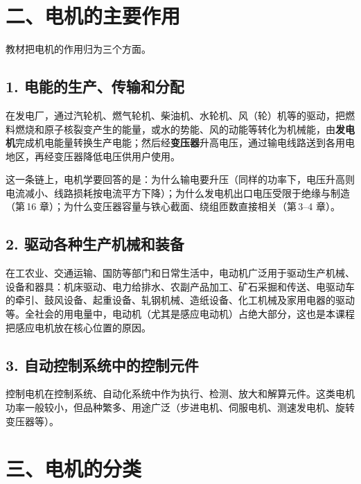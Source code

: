 
\section*{二、电机的主要作用}

教材把电机的作用归为三个方面。

\subsection*{1. 电能的生产、传输和分配}
在发电厂，通过汽轮机、燃气轮机、柴油机、水轮机、风（轮）机等的驱动，把燃料燃烧和原子核裂变产生的能量，或水的势能、风的动能等转化为机械能，由\textbf{发电机}完成机电能量转换生产电能；然后经\textbf{变压器}升高电压，通过输电线路送到各用电地区，再经变压器降低电压供用户使用。

这一条链上，电机学要回答的是：为什么输电要升压（同样的功率下，电压升高则电流减小、线路损耗按电流平方下降）；为什么发电机出口电压受限于绝缘与制造（第\,16 章）；为什么变压器容量与铁心截面、绕组匝数直接相关（第\,3--4 章）。

\subsection*{2. 驱动各种生产机械和装备}
在工农业、交通运输、国防等部门和日常生活中，电动机广泛用于驱动生产机械、设备和器具：机床驱动、电力给排水、农副产品加工、矿石采掘和传送、电驱动车的牵引、鼓风设备、起重设备、轧钢机械、造纸设备、化工机械及家用电器的驱动等。全社会的用电量中，电动机（尤其是感应电动机）占绝大部分，这也是本课程把感应电机放在核心位置的原因。

\subsection*{3. 自动控制系统中的控制元件}
控制电机在控制系统、自动化系统中作为执行、检测、放大和解算元件。这类电机功率一般较小，但品种繁多、用途广泛（步进电机、伺服电机、测速发电机、旋转变压器等）。

\section*{三、电机的分类}


